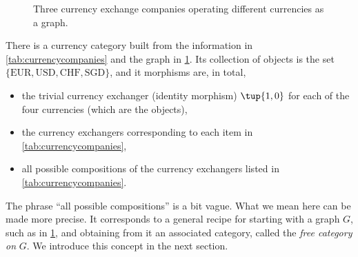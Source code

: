 \begin{figure}[h]
\begin{center}
\end{center}
\caption{Three currency exchange companies operating different currencies as a graph. \label{fig:currencygraph}}
\end{figure}

There is a currency category built from the information in \cref{tab:currencycompanies} and the graph in \cref{fig:currencygraph}. Its collection of objects is the set $\{  \text{EUR}, \text{USD}, \text{CHF}, \text{SGD} \}$, and it morphisms are, in total, 
\begin{itemize}
\item the trivial currency exchanger (identity morphism) $\tup{1,0}$ for each of the four currencies (which are the objects),
\item the currency exchangers corresponding to each item in \cref{tab:currencycompanies},
\item all possible compositions of the currency exchangers listed in \cref{tab:currencycompanies}.
\end{itemize}

The phrase ``all possible compositions'' is a bit vague. What we mean here can be made more precise. It corresponds to a general recipe for starting with a graph $G$, such as in \cref{fig:currencygraph}, and obtaining from it an associated category, called the \emph{free category on} $G$. We introduce this concept in the next section. 

